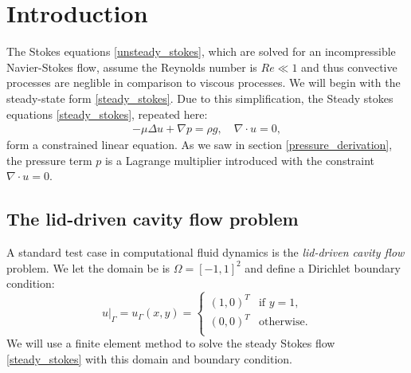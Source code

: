 \section{Introduction}
The Stokes equations \eqref{unsteady_stokes}, which are solved for an incompressible Navier-Stokes flow,
assume the Reynolds number is $Re \ll 1$ and thus convective processes are neglible in comparison to viscous processes.
We will begin with the steady-state form \eqref{steady_stokes}.
Due to this simplification, the Steady stokes equations \eqref{steady_stokes}, repeated here:
\begin{align*}
    -\mu\Delta u + \nabla p = \rho g, \quad \nabla\cdot u = 0,
\end{align*}
form a constrained linear equation. As we saw in section \ref{pressure_derivation}, the pressure term $p$ is a Lagrange multiplier introduced
with the constraint $\nabla\cdot u = 0$.
\subsection{The lid-driven cavity flow problem}
A standard test case in computational fluid dynamics is the \textit{lid-driven cavity flow} problem.
We let the domain be is $\Omega = [-1,1]^2$ and define a Dirichlet boundary condition:
\begin{equation}\label{lid_driven_boundary_condition}
    \left.u\right|_\Gamma = u_\Gamma(x,y) =
    \left\{\begin{array}{lr}
        \left(1, 0\right)^T &\text{if $y = 1$,}\\
        \left(0, 0\right)^T &\text{otherwise}.\\
        \end{array}\right.
\end{equation}
We will use a finite element method to solve the steady Stokes flow \eqref{steady_stokes} with this domain and boundary condition.

